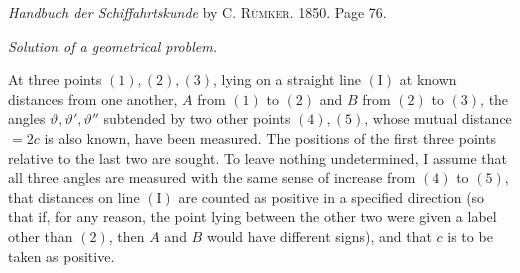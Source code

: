 \par\bigskip{}
\begin{center}\textit{Handbuch der Schiffahrtskunde} by C. \textsc{Rümker}. 1850. Page 76.\par\medskip
\textit{Solution of a geometrical problem.}\end{center}
\hspace*{\parindent}At three points \((1),(2),(3)\), lying on a straight line \(\mathrm{(I)}\) at known distances from one another, \(A\) from \((1)\) to \((2)\) and \(B\) from \((2)\) to \((3)\), the angles \(\vartheta,\vartheta',\vartheta''\) subtended by two other points \((4),(5)\), whose mutual distance \(=2c\) is also known, have been measured. The positions of the first three points relative to the last two are sought. To leave nothing undetermined, I assume that all three angles are measured with the same sense of increase from \((4)\) to \((5)\), that distances on line \(\mathrm{(I)}\) are counted as positive in a specified direction (so that if, for any reason, the point lying between the other two were given a label other than \((2)\), then \(A\) and \(B\) would have different signs), and that \(c\) is to be taken as positive.
